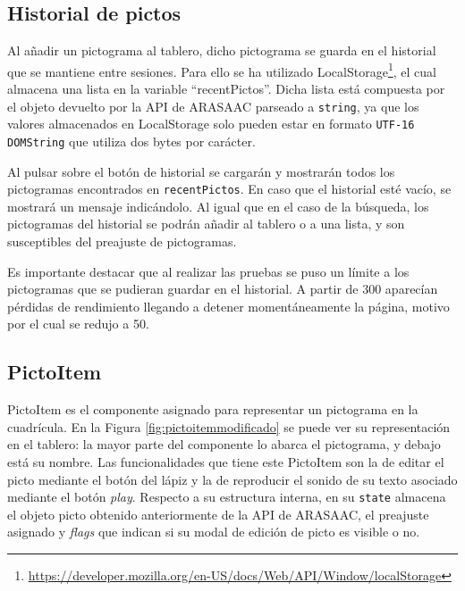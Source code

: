 \subsection{Historial de pictos}

Al añadir un pictograma al tablero, dicho pictograma se guarda en el historial que se mantiene entre sesiones. Para ello se ha utilizado LocalStorage\footnote{\url{https://developer.mozilla.org/en-US/docs/Web/API/Window/localStorage}}, el cual almacena una lista en la variable “recentPictos”. Dicha lista está compuesta por el objeto devuelto por la API de ARASAAC parseado a \texttt{string}, ya que los valores almacenados en LocalStorage solo pueden estar en formato \texttt{UTF-16 DOMString} que utiliza dos bytes por carácter.

Al pulsar sobre el botón de historial se cargarán y mostrarán todos los pictogramas encontrados en \texttt{recentPictos}. En caso que el historial esté vacío, se mostrará un mensaje indicándolo. Al igual que en el caso de la búsqueda, los pictogramas del historial se podrán añadir al tablero o a una lista, y son susceptibles del preajuste de pictogramas.

Es importante destacar que al realizar las pruebas se puso un límite a los pictogramas que se pudieran guardar en el historial. A partir de 300 aparecían pérdidas de rendimiento llegando a detener momentáneamente la página, motivo por el cual se redujo a 50.

\subsection{PictoItem}

PictoItem es el componente asignado para representar un pictograma en la cuadrícula. En la Figura \ref{fig:pictoitemmodificado} se puede ver su representación en el tablero: la mayor parte del componente lo abarca el pictograma, y debajo está su nombre. Las funcionalidades que tiene este PictoItem son la de editar el picto mediante el botón del lápiz y la de reproducir el sonido de su texto asociado mediante el botón \textit{play}. Respecto a su estructura interna, en su \texttt{state} almacena el objeto picto obtenido anteriormente de la API de ARASAAC, el preajuste asignado y \textit{flags} que indican si su modal de edición de  picto es visible o no. 


